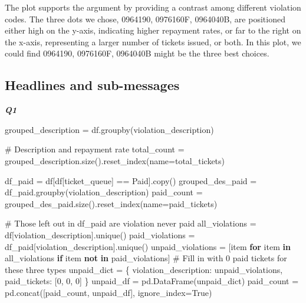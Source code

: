 \documentclass[
  letterpaper,
  DIV=11,
  numbers=noendperiod]{scrartcl}
\newenvironment{Shaded}{\begin{snugshade}}{\end{snugshade}}
\newcommand{\CommentTok}[1]{\textcolor[rgb]{0.37,0.37,0.37}{#1}}
\newcommand{\ControlFlowTok}[1]{\textcolor[rgb]{0.00,0.23,0.31}{\textbf{#1}}}
\newcommand{\DecValTok}[1]{\textcolor[rgb]{0.68,0.00,0.00}{#1}}
\newcommand{\KeywordTok}[1]{\textcolor[rgb]{0.00,0.23,0.31}{\textbf{#1}}}
\newcommand{\NormalTok}[1]{\textcolor[rgb]{0.00,0.23,0.31}{#1}}
\newcommand{\OperatorTok}[1]{\textcolor[rgb]{0.37,0.37,0.37}{#1}}
\newcommand{\StringTok}[1]{\textcolor[rgb]{0.13,0.47,0.30}{#1}}
\newcommand{\VariableTok}[1]{\textcolor[rgb]{0.07,0.07,0.07}{#1}}
\begin{document}
The plot supports the argument by providing a contrast among different
violation codes. The three dots we chose, 0964190, 0976160F, 0964040B,
are positioned either high on the y-axis, indicating higher repayment
rates, or far to the right on the x-axis, representing a larger number
of tickets issued, or both. In this plot, we could find 0964190,
0976160F, 0964040B might be the three best choices. \newpage

\subsection{Headlines and
sub-messages}\label{headlines-and-sub-messages}

\textbf{\emph{Q1}}

\begin{Shaded}
\begin{Highlighting}[]
\NormalTok{grouped\_description }\OperatorTok{=}\NormalTok{ df.groupby(}\StringTok{\textquotesingle{}violation\_description\textquotesingle{}}\NormalTok{)}

\CommentTok{\# Description and repayment rate}
\NormalTok{total\_count }\OperatorTok{=}\NormalTok{ grouped\_description.size().reset\_index(name}\OperatorTok{=}\StringTok{\textquotesingle{}total\_tickets\textquotesingle{}}\NormalTok{)}

\NormalTok{df\_paid }\OperatorTok{=}\NormalTok{ df[df[}\StringTok{\textquotesingle{}ticket\_queue\textquotesingle{}}\NormalTok{] }\OperatorTok{==} \StringTok{\textquotesingle{}Paid\textquotesingle{}}\NormalTok{].copy()}
\NormalTok{grouped\_des\_paid }\OperatorTok{=}\NormalTok{ df\_paid.groupby(}\StringTok{\textquotesingle{}violation\_description\textquotesingle{}}\NormalTok{)}
\NormalTok{paid\_count }\OperatorTok{=}\NormalTok{ grouped\_des\_paid.size().reset\_index(name}\OperatorTok{=}\StringTok{\textquotesingle{}paid\_tickets\textquotesingle{}}\NormalTok{)}

\CommentTok{\# Those left out in df\_paid are violation never paid}
\NormalTok{all\_violations }\OperatorTok{=}\NormalTok{ df[}\StringTok{\textquotesingle{}violation\_description\textquotesingle{}}\NormalTok{].unique()}
\NormalTok{paid\_violations }\OperatorTok{=}\NormalTok{ df\_paid[}\StringTok{\textquotesingle{}violation\_description\textquotesingle{}}\NormalTok{].unique()}
\NormalTok{unpaid\_violations }\OperatorTok{=}\NormalTok{ [item }\ControlFlowTok{for}\NormalTok{ item }\KeywordTok{in}\NormalTok{ all\_violations }\ControlFlowTok{if}\NormalTok{ item }\KeywordTok{not} \KeywordTok{in}\NormalTok{ paid\_violations]}
\CommentTok{\# Fill in with 0 paid tickets for these three types}
\NormalTok{unpaid\_dict }\OperatorTok{=}\NormalTok{ \{}
    \StringTok{\textquotesingle{}violation\_description\textquotesingle{}}\NormalTok{: unpaid\_violations, }
    \StringTok{\textquotesingle{}paid\_tickets\textquotesingle{}}\NormalTok{: [}\DecValTok{0}\NormalTok{, }\DecValTok{0}\NormalTok{, }\DecValTok{0}\NormalTok{]}
\NormalTok{    \}}
\NormalTok{unpaid\_df }\OperatorTok{=}\NormalTok{ pd.DataFrame(unpaid\_dict)}
\NormalTok{paid\_count }\OperatorTok{=}\NormalTok{ pd.concat([paid\_count, unpaid\_df], ignore\_index}\OperatorTok{=}\VariableTok{True}\NormalTok{)}


\end{Highlighting}
\end{Shaded}
\end{document}
